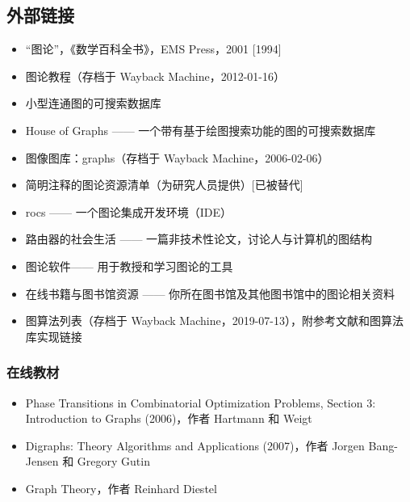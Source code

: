 \subsection{外部链接}
\begin{itemize}
\item “图论”，《数学百科全书》，EMS Press，2001 [1994]
\item 图论教程（存档于 Wayback Machine，2012-01-16）
\item 小型连通图的可搜索数据库
\item House of Graphs —— 一个带有基于绘图搜索功能的图的可搜索数据库
\item 图像图库：graphs（存档于 Wayback Machine，2006-02-06）
\item 简明注释的图论资源清单（为研究人员提供）[已被替代]
\item rocs —— 一个图论集成开发环境（IDE）
\item 路由器的社会生活 —— 一篇非技术性论文，讨论人与计算机的图结构
\item 图论软件—— 用于教授和学习图论的工具
\item 在线书籍与图书馆资源 —— 你所在图书馆及其他图书馆中的图论相关资料
\item 图算法列表（存档于 Wayback Machine，2019-07-13），附参考文献和图算法库实现链接
\end{itemize}
\subsubsection{在线教材}
\begin{itemize}
\item Phase Transitions in Combinatorial Optimization Problems, Section 3: Introduction to Graphs (2006)，作者 Hartmann 和 Weigt
\item Digraphs: Theory Algorithms and Applications (2007)，作者 Jorgen Bang-Jensen 和 Gregory Gutin
\item Graph Theory，作者 Reinhard Diestel
\end{itemize}